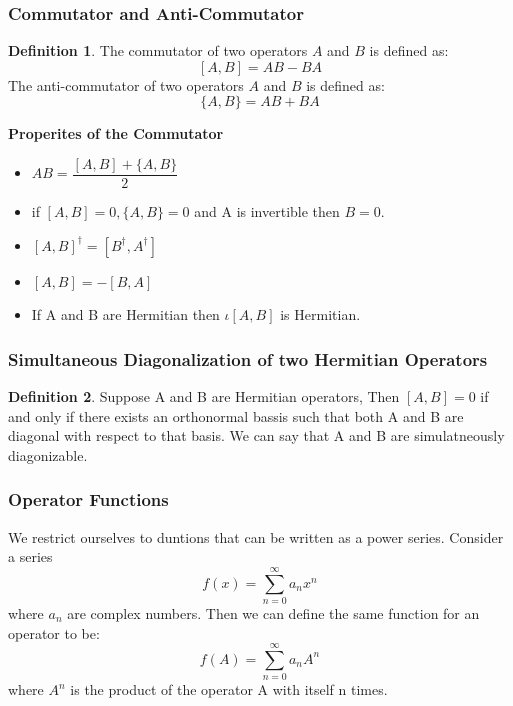 \documentclass[12pt, oneside]{book}
\theoremstyle{definition}
\newtheorem{definition}{Definition}[section]
\theoremstyle{definition}
\theoremstyle{remark}
\begin{document}
\subsubsection{Commutator and Anti-Commutator}
\begin{definition}
    The commutator of two operators $A$ and $B$ is defined as:
    \[ [A,B]=AB-BA \]
    The anti-commutator of two operators $A$ and $B$ is defined as:
    \[ \{A,B\}=AB+BA \]
\end{definition}
\textbf{Properites of the Commutator}
\begin{itemize}
    \item $AB=\dfrac{[A,B]+\{A,B\}}{2}$
    \item if $[A,B]=0,\{A,B\}=0$ and A is invertible then $B=0$.
    \item $[A,B]^{\dagger}=[B^{\dagger},A^{\dagger}]$
    \item $[A,B]=-[B,A]$
    \item If A and B are Hermitian then $\iota [A,B]$ is Hermitian.
\end{itemize}

\subsubsection{Simultaneous Diagonalization of two Hermitian Operators}
\begin{definition}
    Suppose A and B are Hermitian operators, Then $[A,B]=0$ if and only if there exists an orthonormal bassis
    such that both A and B are diagonal with respect to that basis. We can say that A and B are simulatneously diagonizable.    
\end{definition}

\subsubsection{Operator Functions}
We restrict ourselves to duntions that can be written as a power series. Consider a series
\[ f(x)=\sum_{n=0}^{\infty} a_nx^n \]
where $a_n$ are complex numbers. Then we can define the same function for an operator to be:
\[ f(A)=\sum_{n=0}^{\infty} a_nA^n \]
where $A^n$ is the product of the operator A with itself n times.\\
\end{document}
